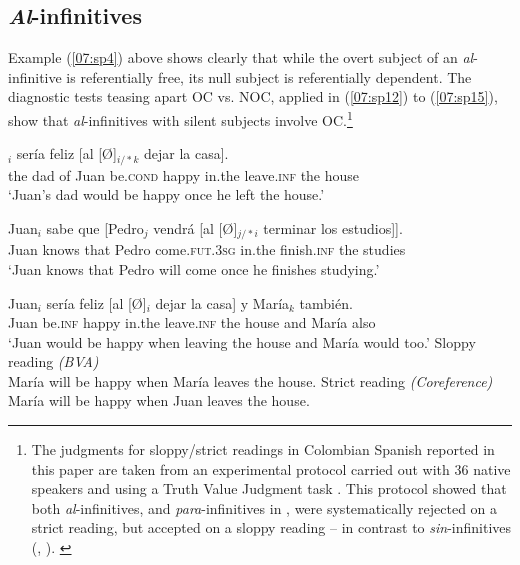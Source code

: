 \documentclass[output=paper,colorlinks,citecolor=brown,draft,draftmode]{langscibook}
\begin{document}
\subsection{\textit{Al}-infinitives}
\label{07:al-infinitives}
Example (\ref{07:sp4}) above shows clearly that while the overt subject of an \textit{al}-infinitive is referentially free, its null subject is referentially dependent. The diagnostic tests teasing apart OC vs. NOC, applied in (\ref{07:sp12}) to (\ref{07:sp15}), show that \textit{al}-infinitives with silent subjects involve OC.\footnote{The judgments for sloppy/strict readings in Colombian Spanish reported in this paper are taken from an experimental protocol carried out with 36 native speakers and using a Truth Value Judgment task \citep{gomezinprogress}. This protocol showed that both \textit{al}-infinitives, and \textit{para}-infinitives in , were systematically rejected on a strict reading, but accepted on a sloppy reading  -- in contrast to \textit{sin}-infinitives (, ). \label{07:alfn}}




\begin{exe}
\ex\label{07:sp12}
$_i$ sería feliz [al [Ø]$_{i/*k}$ dejar la casa].\\
the dad of Juan be.\textsc{cond} happy in.the {} leave.\textsc{inf} the house\\
\glt ‘Juan’s dad would be happy once he left the house.’
\end{exe}

\begin{exe}
\ex\label{07:sp13}
\gll Juan$_i$ sabe que [Pedro$_j$ vendrá  [al [Ø]$_{j/*i}$ terminar los estudios]].\\
Juan knows that Pedro come.\textsc{fut.3sg}  in.the {} finish.\textsc{inf} the studies\\
\glt ‘Juan knows that Pedro will come once he finishes studying.’
\end{exe}


\begin{exe}
\ex\label{07:sp14}
\gll Juan$_i$ sería feliz [al [Ø]$_i$ dejar la casa]  y María$_k$ también.\\
Juan be.\textsc{inf} happy in.the {} leave.\textsc{inf} the house and María also\\
\glt ‘Juan would be happy when leaving the house and María would too.’
\ea \cmark Sloppy reading \textit{(BVA)}\\
 María will be happy when María leaves the house.
 \ex \xmark Strict reading \textit{(Coreference)}\\
 María will be happy when Juan leaves the house.
 \z
\end{exe}
\end{document}
